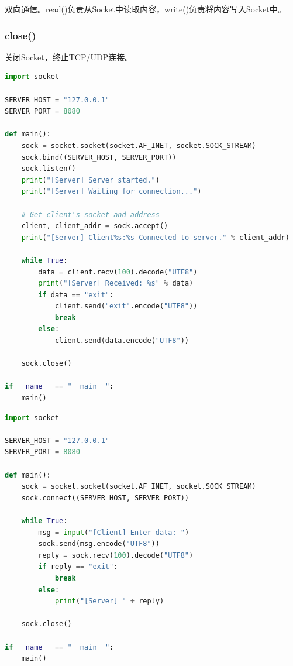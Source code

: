 双向通信。read()负责从Socket中读取内容，write()负责将内容写入Socket中。\\

\subsubsection{close()}

关闭Socket，终止TCP/UDP连接。\\


\begin{lstlisting}[language=Python, title=tcp\_server.py]
import socket

SERVER_HOST = "127.0.0.1"
SERVER_PORT = 8080

def main():
    sock = socket.socket(socket.AF_INET, socket.SOCK_STREAM)
    sock.bind((SERVER_HOST, SERVER_PORT))
    sock.listen()
    print("[Server] Server started.")
    print("[Server] Waiting for connection...")

    # Get client's socket and address
    client, client_addr = sock.accept()
    print("[Server] Client%s:%s Connected to server." % client_addr)

    while True:
        data = client.recv(100).decode("UTF8")
        print("[Server] Received: %s" % data)
        if data == "exit":
            client.send("exit".encode("UTF8"))
            break
        else:
            client.send(data.encode("UTF8"))
    
    sock.close()

if __name__ == "__main__":
    main()
\end{lstlisting}

\begin{lstlisting}[language=Python, title=tcp\_client.py]
import socket

SERVER_HOST = "127.0.0.1"
SERVER_PORT = 8080

def main():
    sock = socket.socket(socket.AF_INET, socket.SOCK_STREAM)
    sock.connect((SERVER_HOST, SERVER_PORT))

    while True:     
        msg = input("[Client] Enter data: ")
        sock.send(msg.encode("UTF8"))
        reply = sock.recv(100).decode("UTF8")
        if reply == "exit":
            break
        else:
            print("[Server] " + reply)

    sock.close()

if __name__ == "__main__":
    main()
\end{lstlisting}

